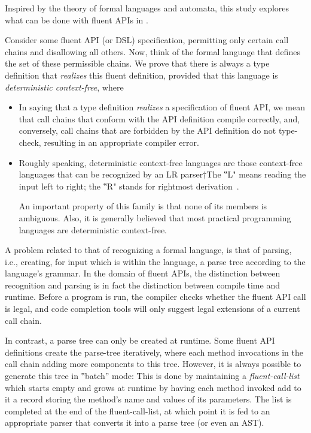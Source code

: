 \documentclass[a4paper,USenglish]{lipics-v2016}
\begin{document}
Inspired by the theory of formal languages and automata,
  this study explores what can be done with fluent APIs in \Java.

Consider some fluent API (or DSL) specification, permitting only certain call
chains and disallowing all others.
Now, think of the formal language that defines the set of these permissible chains.
We prove that there is always a \Java type definition that
  \emph{realizes} this fluent definition, provided that this
  language is \emph{deterministic context-free}, where
\begin{itemize}
  \item In saying that a type definition \emph{realizes} a specification of fluent
    API, we mean that call chains that conform with the API definition compile
    correctly, and, conversely, call chains that are forbidden by the API
    definition do not type-check, resulting in an appropriate compiler error.
  \item Roughly speaking, deterministic context-free languages are those
    context-free languages that can be recognized by an LR parser†{The ‟L"
    means reading the input left to right; the ‟R" stands for rightmost derivation}~\cite{Aho:Sethi:Ullman:86}.
    \par
    An important property of this family is that none of its members is ambiguous.
    Also, it is generally believed that most practical programming languages
    are deterministic context-free.
\end{itemize}

A problem related to that of recognizing a formal language,
is that of parsing, i.e., creating, for input which is within the language,
  a parse tree according to the language's grammar.
In the domain of fluent APIs, the distinction between recognition and parsing is
  in fact the distinction between compile time and runtime.
Before a program is run, the compiler checks whether the fluent API call is legal,
  and code completion tools will only suggest legal extensions of a current call chain.

In contrast, a parse tree can only be created at runtime.
Some fluent API definitions create the parse-tree
  iteratively, where each method invocations in the call chain adding
  more components to this tree.
However, it is always possible to generate this tree in ‟batch” mode:
This is done by maintaining a \emph{fluent-call-list} which
  starts empty and grows at runtime by having each method invoked add to it
  a record storing the method's name and values of its parameters.
The list is completed at the end of the fluent-call-list, at which point it is fed to an appropriate parser that
  converts it into a parse tree (or even an AST).
\end{document}
